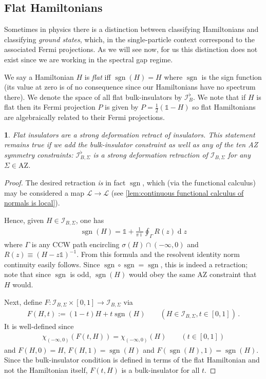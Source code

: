 \documentclass[a4paper,10pt]{article}
\numberwithin{equation}{section}
\theoremstyle{plain}
\theoremstyle{plain}
\newtheorem{lem}[thm]{\protect\lemmaname}
\theoremstyle{plain}
\theoremstyle{plain}
\theoremstyle{plain}
\theoremstyle{remark}
\theoremstyle{definition}
\theoremstyle{plain}
\providecommand{\lemmaname}{Lemma}
\newcommand{\ii}{\operatorname{i}}
\newcommand{\calL}{\mathcal{L}}
\newcommand{\calI}{\mathcal{I}}
\newcommand{\dif}{\operatorname{d}}
\newcommand{\Id}{\mathds{1}}
\newcommand{\sgn}{\operatorname{sgn}}
\newcommand{\eq}[1]{\begin{align*}#1\end{align*}}
\begin{document}
	\subsection{Flat Hamiltonians}
	Sometimes in physics there is a distinction between classifying Hamiltonians and classifying \emph{ground states}, which, in the single-particle context correspond to the associated Fermi projections. As we will see now, for us this distinction does not exist since we are working in the spectral gap regime.
	
	We say a Hamiltonian $H$ is \emph{flat} iff $\sgn(H)=H$ where $\sgn$ is the sign function (its value at zero is of no consequence since our Hamiltonians have no spectrum there). We denote the space of all flat bulk-insulators by $\calI_B^\flat$. We note that if $H$ is flat then its Fermi projection $P$ is given by $ P = \frac{1}{2}\left(\Id-H\right)$ so flat Hamiltonians are algebraically related to their Fermi projections.
	\begin{lem}\label{lem:flat Hamiltonians are strong deformation retraction} Flat insulators are a strong deformation retract of insulators. This statement remains true if we add the bulk-insulator constraint as well as any of the ten AZ symmetry constraints: $\calI_{B,\Sigma}^\flat$ is a strong deformation retraction of $\calI_{B,\Sigma}$ for any $\Sigma\in\mathrm{AZ}$. 
	\end{lem}
	\begin{proof}
		The desired retraction \emph{is} in fact $\sgn$, which (via the functional calculus) may be considered a map $\calL\to\calL$ (see \cref{lem:continuous functional calculus of normals is local}). 
		
		Hence, given $H\in\calI_{B,\Sigma}$, one has \eq{ \sgn(H) = \Id + \frac{1}{\pi \ii}\oint_\Gamma R(z)\dif{z}} where $\Gamma$ is any CCW path encircling $\sigma(H)\cap(-\infty,0)$ and $R(z)\equiv(H-z\Id)^{-1}$. From this formula and the resolvent identity norm continuity easily follows. Since $\sgn\circ\sgn=\sgn$, this is indeed a retraction; note that since $\sgn$ is odd, $\sgn(H)$ would obey the same AZ constraint that $H$ would.
		
		Next, define $F:\calI_{B,\Sigma}\times[0,1]\to\calI_{B,\Sigma}$ via \eq{F(H,t) := (1-t)H+t\sgn(H)\qquad(H\in\calI_{B,\Sigma},t\in[0,1])\,.} It is well-defined since \eq{\chi_{(-\infty,0)}(F(t,H)) = \chi_{(-\infty,0)}(H)\qquad(t\in[0,1])} and $F(H,0)=H$, $F(H,1)=\sgn(H)$ and $F(\sgn(H),1)=\sgn(H)$. Since the bulk-insulator condition is defined in terms of the flat Hamiltonian and not the Hamiltonian itself, $F(t,H)$ is a bulk-insulator for all $t$.
	\end{proof}
	
\end{document}
